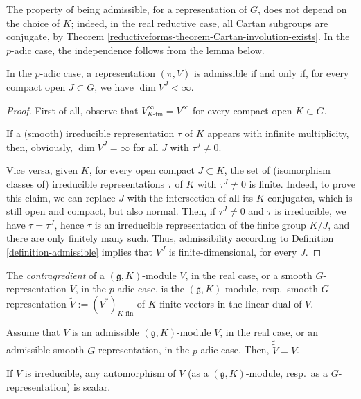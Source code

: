 \begin{remark}
 \label{remark-admissible-indep-K}
The property of being admissible, for a representation of $G$, does not depend on the choice of $K$; indeed, in the real reductive case, all Cartan subgroups are conjugate, by Theorem \ref{reductiveforms-theorem-Cartan-involution-exists}. In the $p$-adic case, the independence follows from the lemma below.
\end{remark}

\begin{lemma}
 \label{lemma-admissible-padic}
In the $p$-adic case, a representation $(\pi, V)$ is admissible if and only if, for every compact open $J\subset G$, we have $\dim V^J <\infty$. 
\end{lemma}

\begin{proof}
 First of all, observe that $V^\infty_{K\text{-fin}} = V^\infty$ for every compact open $K\subset G$.  
 
 If a (smooth) irreducible representation $\tau$ of $K$ appears with infinite multiplicity, then, obviously, $\dim V^J = \infty$ for all $J$ with $\tau^J\ne 0$. 
 
 Vice versa, given $K$, for every open compact $J\subset K$, the set of (isomorphism classes of) irreducible representations $\tau$ of $K$ with $\tau^J\ne 0$ is finite. Indeed, to prove this claim, we can replace $J$ with the intersection of all its $K$-conjugates, which is still open and compact, but also normal. Then, if $\tau^J\ne 0$ and $\tau$ is irreducible, we have $\tau = \tau^J$, hence $\tau$ is an irreducible representation of the finite group $K/J$, and there are only finitely many such. Thus, admissibility according to Definition \ref{definition-admissible} implies that $V^J$ is finite-dimensional, for every $J$.  
\end{proof}

\begin{definition}
 \label{definition-contragredient}
The {\it contragredient} of a $(\mathfrak g,K)$-module $V$, in the real case, or a smooth $G$-representation $V$, in the $p$-adic case, is the $(\mathfrak g, K)$-module, resp.\ smooth $G$-representation $\tilde V:=(V^*)_{K\text{-fin}}$ of $K$-finite vectors in the linear dual of $V$. 
\end{definition}



\begin{lemma}
 \label{lemma-admissible-gK}
Assume that $V$ is an admissible $(\mathfrak g,K)$-module $V$, in the real case, or an admissible smooth $G$-representation, in the $p$-adic case. Then, $\tilde{\tilde V} = V$.

If $V$ is irreducible, any automorphism of $V$ (as a $(\mathfrak g,K)$-module, resp.\ as a $G$-representation) is scalar.
\end{lemma}

